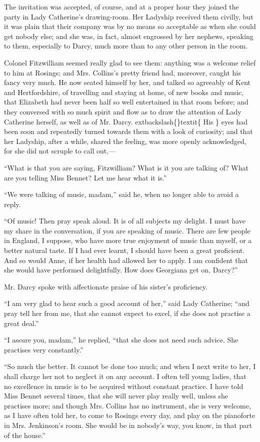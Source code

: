 \documentclass[10pt]{book}
\begin{document}
   The invitation was accepted, of course, and at a proper hour they joined
the party in Lady Catherine’s drawing-room. Her Ladyship received them
civilly, but it was plain that their company was by no means so
acceptable as when she could get nobody else; and she was, in fact,
almost engrossed by her nephews, speaking to them, especially to Darcy,
much more than to any other person in the room.
  

   Colonel Fitzwilliam seemed really glad to see them: anything was a
welcome relief to him at Rosings; and Mrs. Collins’s pretty friend had,
moreover, caught his fancy very much. He now seated himself by her, and
talked so agreeably of Kent and Hertfordshire, of travelling and staying
at home, of new books and music, that Elizabeth had never been half so
well entertained in that room before; and they conversed with so much
spirit and flow as to draw the attention of Lady Catherine herself, as
well as of Mr. Darcy.
   	extbackslash\{\}textit\{
    His
   \}
   eyes had been soon and repeatedly turned
towards them with a look of curiosity; and that her Ladyship, after a
while, shared the feeling, was more openly acknowledged, for she did not
scruple to call out,—
  

   “What is that you are saying, Fitzwilliam? What is it you are talking
of? What are you telling Miss Bennet? Let me hear what it is.”
  

   “We were talking of music, madam,” said he, when no longer able to avoid
a reply.
  

   “Of music! Then pray speak aloud. It is of all subjects my delight. I
must have my share in the conversation, if you are speaking of music.
There are few people in England, I suppose, who have more true
   enjoyment of music than myself, or a better natural taste. If I had ever
learnt, I should have been a great proficient. And so would Anne, if her
health had allowed her to apply. I am confident that she would have
performed delightfully. How does Georgiana get on, Darcy?”
  

   Mr. Darcy spoke with affectionate praise of his sister’s proficiency.
  

   “I am very glad to hear such a good account of her,” said Lady
Catherine; “and pray tell her from me, that she cannot expect to excel,
if she does not practise a great deal.”
  

   “I assure you, madam,” he replied, “that she does not need such advice.
She practises very constantly.”
  

   “So much the better. It cannot be done too much; and when I next write
to her, I shall charge her not to neglect it on any account. I often
tell young ladies, that no excellence in music is to be acquired without
constant practice. I have told Miss Bennet several times, that she will
never play really well, unless she practises more; and though Mrs.
Collins has no instrument, she is very welcome, as I have often told
her, to come to Rosings every day, and play on the pianoforte in Mrs.
Jenkinson’s room. She would be in nobody’s way, you know, in that part
of the house.”
  
\end{document}
